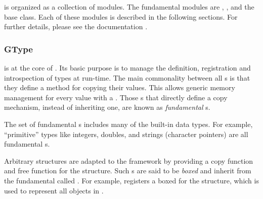\documentclass[article,shortnames]{jss}
\begin{document}
 is organized as a collection of modules. The fundamental
modules are , , and the base
 class. Each of these modules is described in the
following sections. For further details, please see the 
documentation \citep{gobject}.

\subsubsection{GType}\label{sec:gtype}
%



 is at the core of . Its basic purpose
is to manage the definition, registration and introspection of types
at run-time. The main commonality between all s is that
they define a method for copying their values. This allows generic
memory management for every value with a . Those
s that directly define a copy mechanism, instead of
inheriting one, are known as \emph{fundamental} s.


The set of fundamental s includes many of the built-in
 data types. For example, ``primitive'' types like
integers, doubles, and strings (character pointers) are all
fundamental s. 

Arbitrary  structures are adapted to the 
framework by providing a copy function and free function for the
structure. Such s are said to be \emph{boxed} and inherit
from the fundamental  called . For
example,  registers a boxed  for the
  structure, which is used to represent all
 objects in .
\end{document}
